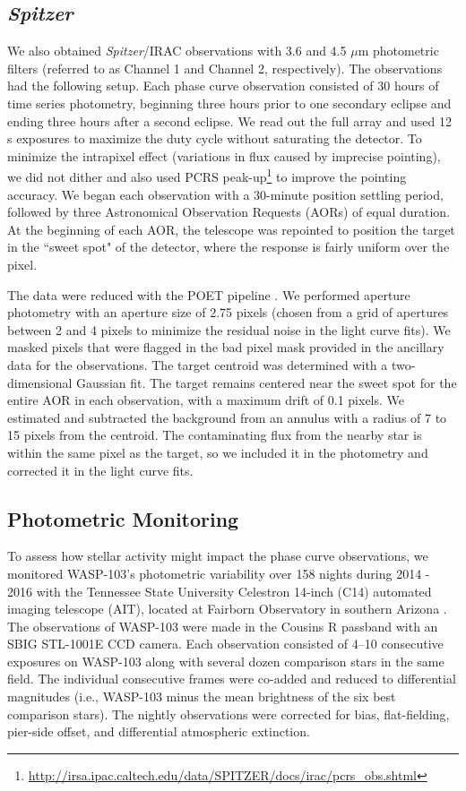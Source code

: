 \documentclass[twocolumn]{aastex61}
\newcommand{\project}[1]{\textsl{#1}}
\newcommand{\Spitzer}{\project{Spitzer}}
\begin{document}
\subsection{\Spitzer}
We also obtained \Spitzer/IRAC observations with 3.6 and 4.5 $\mu$m photometric filters (referred to as Channel 1 and Channel 2, respectively). The observations had the following setup. Each phase curve observation consisted of 30 hours of time series photometry, beginning three hours prior to one secondary eclipse and ending three hours after a second eclipse.  We read out the full array and used 12 s exposures to maximize the duty cycle without saturating the detector. To minimize the intrapixel effect (variations in flux caused by imprecise pointing), we did not dither and also used PCRS peak-up\footnote{\url{http://irsa.ipac.caltech.edu/data/SPITZER/docs/irac/pcrs\_obs.shtml}} to improve the pointing accuracy. We began each observation with a 30-minute position settling period, followed by three Astronomical Observation Requests (AORs) of equal duration. At the beginning of each AOR, the telescope was repointed to position the target in the ``sweet spot" of the detector, where the response is fairly uniform over the pixel.

The data were reduced with the POET pipeline \citep{stevenson12, cubillos13}. We performed aperture photometry with an aperture size of 2.75 pixels (chosen from a grid of apertures between 2 and 4 pixels to minimize the residual noise in the light curve fits). We masked pixels that were flagged in the bad pixel mask provided in the ancillary data for the observations. The target centroid was determined with a two-dimensional Gaussian fit.  The target remains centered near the sweet spot for the entire AOR in each observation, with a maximum drift of 0.1 pixels. We estimated and subtracted the background from an annulus with a radius of 7 to 15 pixels from the centroid. The contaminating flux from the nearby star is within the same pixel as the target, so we included it in the photometry and corrected it in the light curve fits.


\subsection{Photometric Monitoring}
To assess how stellar activity might impact the phase curve observations, we monitored WASP-103's photometric variability over 158 nights during 2014 - 2016 with the Tennessee State University Celestron 14-inch (C14) automated imaging telescope (AIT), located at Fairborn Observatory in southern Arizona \citep[][]{henry99}.  The observations of WASP-103 were made in the Cousins R passband with an SBIG STL-1001E CCD camera.  Each observation consisted of 4--10 consecutive exposures on WASP-103 along with several dozen comparison stars in the same field. The individual consecutive frames were co-added and reduced to differential magnitudes (i.e., WASP-103 minus the mean brightness of the six best comparison stars). The nightly observations were corrected for bias, flat-fielding, pier-side offset, and differential atmospheric extinction.  
\end{document}
